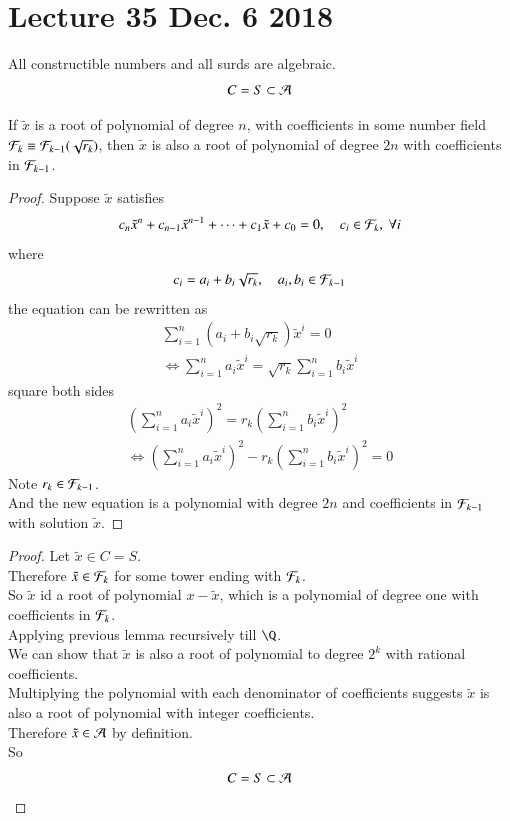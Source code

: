 \documentclass[10pt]{article}
\begin{document}
	\section{Lecture 35 Dec. 6 2018}
		\begin{theorem}
			All constructible numbers and all surds are algebraic.
			\[
				C = S \subset \mathcal{{A}}
			\]
		\end{theorem}
		\begin{lemma}
			If $\tilde{x}$ is a root of polynomial of degree $n$, with coefficients in some number field $\mathcal{{F}}_k \equiv \mathcal{{F}}_{k-1}(\sqrt{r_k})$, then $\tilde{x}$ is also a root of polynomial of degree $2n$ with coefficients in $\mathcal{{F}}_{k-1}$.
		\end{lemma}
		\begin{proof}
			Suppose $\tilde{x}$ satisfies
			\[
				c_n \tilde{x}^n + c_{n-1} \tilde{x}^{n-1} + \cdots + c_1 \tilde{x} + c_0 = 0,\quad c_i \in \mathcal{{F}}_k,\ \forall i
			\]
			where 
			\[
				c_i = a_i + b_i \sqrt{r_k},\quad a_i, b_i \in \mathcal{{F}}_{k-1}
			\]
			the equation can be rewritten as 
			\begin{gather*}
				\sum_{i=1}^n (a_i + b_i \sqrt{r_k}) \tilde{x}^i = 0 \\
				\iff \sum_{i=1}^n a_i \tilde{x}^i = \sqrt{r_k} \sum_{i=1}^n b_i \tilde{x}^i 
			\end{gather*}
			square both sides 
			\begin{gather*}
				(\sum_{i=1}^n a_i \tilde{x}^i)^2 = r_k (\sum_{i=1}^n b_i \tilde{x}^i)^2 \\
				\iff (\sum_{i=1}^n a_i \tilde{x}^i)^2 - r_k (\sum_{i=1}^n b_i \tilde{x}^i)^2 = 0
			\end{gather*}
			Note $r_k \in \mathcal{{F}}_{k-1}$. \\
			And the new equation is a polynomial with degree $2n$ and coefficients in $\mathcal{{F}}_{k-1}$ with solution $\tilde{x}$.
		\end{proof}
		\begin{proof}
			Let $\tilde{x} \in C = S$. \\
			Therefore $\tilde{x} \in \mathcal{{F}}_k$ for some tower ending with $\mathcal{{F}}_k$. \\
			So $\tilde{x}$ id a root of polynomial $x - \tilde{x}$, which is a polynomial of degree one with coefficients in $\mathcal{{F}}_k$.\\
			Applying previous lemma recursively till $\Q$. \\
			We can show that $\tilde{x}$ is also a root of polynomial to degree $2^k$ with rational coefficients. \\
			Multiplying the polynomial with each denominator of coefficients suggests $\tilde{x}$ is also a root of polynomial with integer coefficients. \\
			Therefore $\tilde{x} \in \mathcal{{A}}$ by definition. \\
			So 
			\[
				C = S \subset \mathcal{{A}}
			\] 
		\end{proof}
\end{document}
